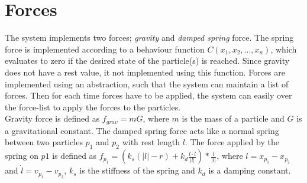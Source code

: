 \section{Forces}
The system implements two forces; \emph{gravity} and \emph{damped spring} force. The spring force is implemented according to a behaviour function $C(x_1, x_2, ..., x_n)$, which evaluates to zero if the desired state of the particle(s) is reached. Since gravity does not have a rest value, it not implemented using this function. Forces are implemented using an abstraction, such that the system can maintain a list of forces. Then for each time forces have to be applied, the system can easily over the force-list to apply the forces to the particles.\\
Gravity force is defined as $f_{grav} = mG$, where $m$ is the mass of a particle and $G$ is a gravitational constant. The damped spring force acts like a normal spring between two particles $p_1$ and $p_2$ with rest length $l$. The force applied by the spring on $p1$ is defined as $f_{p_1} = (k_s (|l| - r) + k_d \frac{\dot{l} \cdot l}{|l|}) * \frac{l}{|l|}$, where $l = x_{p_1} - x_{p_2}$ and $\dot{l} = v_{p_1} - v_{p_2}$, $k_s$ is the stiffness of the spring and $k_d$ is a damping constant. 